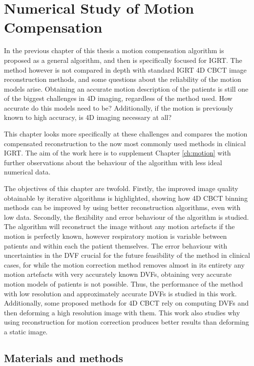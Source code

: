 \chapter{Numerical Study of Motion Compensation}


In the previous chapter of this thesis a motion compensation algorithm is proposed as a general algorithm, and then is specifically focused for IGRT. The method however is not compared in depth with standard IGRT 4D CBCT image reconstruction methods, and some questions about the reliability of the motion models arise. Obtaining an accurate motion description of the patients is still one of the biggest challenges in 4D imaging, regardless of the method used. How accurate do this models need to be? Additionally, if the motion is previously known to high accuracy, is 4D imaging necessary at all? 

This chapter looks more specifically at these challenges and compares the motion compensated reconstruction to the now most commonly used methods in clinical IGRT. The aim of the work here is to supplement Chapter \ref{ch:motion} with further observations about the behaviour of the algorithm with less ideal numerical data.

The objectives of this chapter are twofold. Firstly, the improved image quality obtainable by iterative algorithms is highlighted, showing how 4D CBCT binning methods can be improved by using better reconstruction algorithms, even with low data. Secondly, the flexibility and error behaviour of the algorithm is studied. The algorithm will reconstruct the image without any motion artefacts if the motion is perfectly known, however respiratory motion is variable between patients and within each the patient themselves. The error behaviour with uncertainties in the DVF crucial for the future feasibility of the method in clinical cases, for while the motion correction method removes almost in its entirety any motion artefacts with very accurately known DVFs, obtaining very accurate motion models of patients is not possible. Thus, the performance of the method with low resolution and approximately accurate DVFs is studied in this work. Additionally, some proposed methods for 4D CBCT rely on computing DVFs and then deforming a high resolution image with them. This work also studies why using reconstruction for motion correction produces better results than deforming a static image.



\section{Materials and methods}


